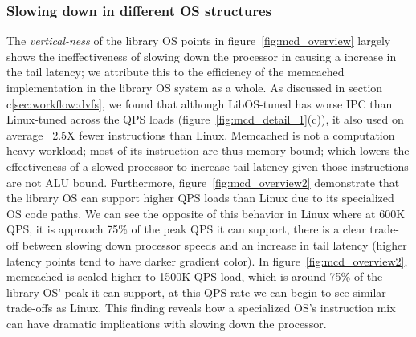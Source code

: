 \subsubsection{Slowing down in different OS structures } 
\label{sec:mcd:slowinos}
The \textit{vertical-ness} of the library OS points in figure~\ref{fig:mcd_overview} largely shows the ineffectiveness of slowing down the processor in causing a increase in the tail latency; we attribute this to the efficiency of the memcached implementation in the library OS system as a whole. As discussed in section c\ref{sec:workflow:dvfs}, we found that although LibOS-tuned has worse IPC than Linux-tuned across the QPS loads (figure~\ref{fig:mcd_detail_1}(c)), it also used on average ~2.5X fewer instructions than Linux. Memcached is not a computation heavy workload; most of its instruction are thus memory bound; which lowers the effectiveness of a slowed processor to increase tail latency given those instructions are not ALU bound. Furthermore, figure~\ref{fig:mcd_overview2} demonstrate that the library OS can support higher QPS loads than Linux due to its specialized OS code paths. We can see the opposite of this behavior in Linux where at 600K QPS, it is approach 75\% of the peak QPS it can support, there is a clear trade-off between slowing down processor speeds and an increase in tail latency (higher latency points tend to have darker gradient color). In figure~\ref{fig:mcd_overview2}, memcached is scaled higher to 1500K QPS load, which is around 75\% of the library OS' peak it can support, at this QPS rate we can begin to see similar trade-offs as Linux. This finding reveals how a specialized OS's instruction mix can have dramatic implications with slowing down the processor.

